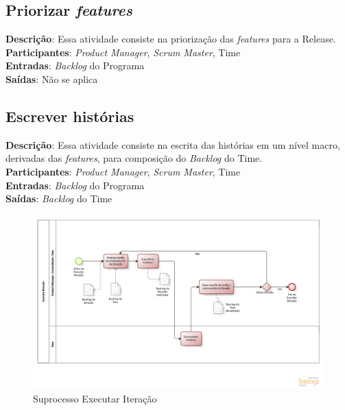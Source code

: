 \subsection{Priorizar \textit{features}}
  \textbf{Descrição}: Essa atividade consiste na priorização das \textit{features} para a Release. \\
  
  \textbf{Participantes}: \textit{Product Manager}, \textit{Scrum Master}, Time\\
  
  \textbf{Entradas}: \textit{Backlog} do Programa \\
  
  \textbf{Saídas}:  Não se aplica\\

\subsection{Escrever histórias}
  \textbf{Descrição}: Essa atividade consiste na escrita das histórias em um nível macro, derivadas das \textit{features}, para composição do \textit{Backlog} do Time. \\
  
  \textbf{Participantes}: \textit{Product Manager}, \textit{Scrum Master}, Time\\
  
  \textbf{Entradas}: \textit{Backlog} do Programa \\
  
  \textbf{Saídas}:   \textit{Backlog} do Time \\

\begin{figure}[!htb]
\includegraphics[scale=0.5]{figuras/iteracao.png}
\caption{Suprocesso Executar Iteração}
\label{fig:iteracao}
\end{figure}

